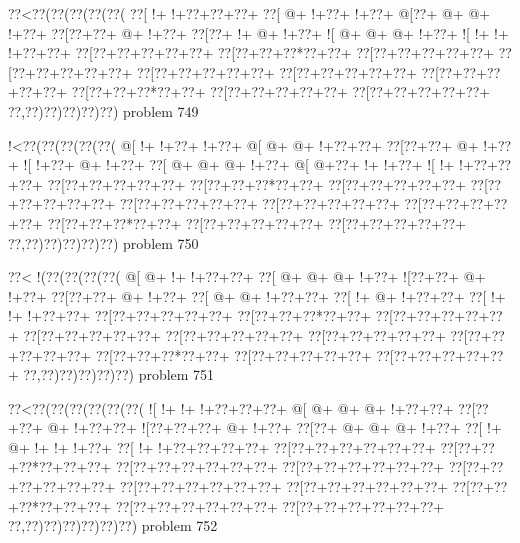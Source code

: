 \vbox{\vbox{\goo
\0??<\0??(\0??(\0??(\0??(\0??(
\0??[\- !+\- !+\0??+\0??+\0??+
\0??[\- @+\- !+\0??+\- !+\0??+
\- @[\0??+\- @+\- @+\- !+\0??+
\0??[\0??+\0??+\- @+\- !+\0??+
\0??[\0??+\- !+\- @+\- !+\0??+
\- ![\- @+\- @+\- @+\- !+\0??+
\- ![\- !+\- !+\- !+\0??+\0??+
\0??[\0??+\0??+\0??+\0??+\0??+
\0??[\0??+\0??+\0??*\0??+\0??+
\0??[\0??+\0??+\0??+\0??+\0??+
\0??[\0??+\0??+\0??+\0??+\0??+
\0??[\0??+\0??+\0??+\0??+\0??+
\0??[\0??+\0??+\0??+\0??+\0??+
\0??[\0??+\0??+\0??+\0??+\0??+
\0??[\0??+\0??+\0??*\0??+\0??+
\0??[\0??+\0??+\0??+\0??+\0??+
\0??[\0??+\0??+\0??+\0??+\0??+
\0??,\0??)\0??)\0??)\0??)\0??)
}
\hfil problem 749\hfil\break
}

\vbox{\vbox{\goo
\- !<\0??(\0??(\0??(\0??(\0??(
\- @[\- !+\- !+\0??+\- !+\0??+
\- @[\- @+\- @+\- !+\0??+\0??+
\0??[\0??+\0??+\- @+\- !+\0??+
\- ![\- !+\0??+\- @+\- !+\0??+
\0??[\- @+\- @+\- @+\- !+\0??+
\- @[\- @+\0??+\- !+\- !+\0??+
\- ![\- !+\- !+\0??+\0??+\0??+
\0??[\0??+\0??+\0??+\0??+\0??+
\0??[\0??+\0??+\0??*\0??+\0??+
\0??[\0??+\0??+\0??+\0??+\0??+
\0??[\0??+\0??+\0??+\0??+\0??+
\0??[\0??+\0??+\0??+\0??+\0??+
\0??[\0??+\0??+\0??+\0??+\0??+
\0??[\0??+\0??+\0??+\0??+\0??+
\0??[\0??+\0??+\0??*\0??+\0??+
\0??[\0??+\0??+\0??+\0??+\0??+
\0??[\0??+\0??+\0??+\0??+\0??+
\0??,\0??)\0??)\0??)\0??)\0??)
}
\hfil problem 750\hfil\break
}

\vbox{\vbox{\goo
\0??<\- !(\0??(\0??(\0??(\0??(
\- @[\- @+\- !+\- !+\0??+\0??+
\0??[\- @+\- @+\- @+\- !+\0??+
\- ![\0??+\0??+\- @+\- !+\0??+
\0??[\0??+\0??+\- @+\- !+\0??+
\0??[\- @+\- @+\- !+\0??+\0??+
\0??[\- !+\- @+\- !+\0??+\0??+
\0??[\- !+\- !+\- !+\0??+\0??+
\0??[\0??+\0??+\0??+\0??+\0??+
\0??[\0??+\0??+\0??*\0??+\0??+
\0??[\0??+\0??+\0??+\0??+\0??+
\0??[\0??+\0??+\0??+\0??+\0??+
\0??[\0??+\0??+\0??+\0??+\0??+
\0??[\0??+\0??+\0??+\0??+\0??+
\0??[\0??+\0??+\0??+\0??+\0??+
\0??[\0??+\0??+\0??*\0??+\0??+
\0??[\0??+\0??+\0??+\0??+\0??+
\0??[\0??+\0??+\0??+\0??+\0??+
\0??,\0??)\0??)\0??)\0??)\0??)
}
\hfil problem 751\hfil\break
}

\vbox{\vbox{\goo
\0??<\0??(\0??(\0??(\0??(\0??(\0??(
\- ![\- !+\- !+\- !+\0??+\0??+\0??+
\- @[\- @+\- @+\- @+\- !+\0??+\0??+
\0??[\0??+\0??+\- @+\- !+\0??+\0??+
\- ![\0??+\0??+\0??+\- @+\- !+\0??+
\0??[\0??+\- @+\- @+\- @+\- !+\0??+
\0??[\- !+\- @+\- !+\- !+\- !+\0??+
\0??[\- !+\- !+\0??+\0??+\0??+\0??+
\0??[\0??+\0??+\0??+\0??+\0??+\0??+
\0??[\0??+\0??+\0??*\0??+\0??+\0??+
\0??[\0??+\0??+\0??+\0??+\0??+\0??+
\0??[\0??+\0??+\0??+\0??+\0??+\0??+
\0??[\0??+\0??+\0??+\0??+\0??+\0??+
\0??[\0??+\0??+\0??+\0??+\0??+\0??+
\0??[\0??+\0??+\0??+\0??+\0??+\0??+
\0??[\0??+\0??+\0??*\0??+\0??+\0??+
\0??[\0??+\0??+\0??+\0??+\0??+\0??+
\0??[\0??+\0??+\0??+\0??+\0??+\0??+
\0??,\0??)\0??)\0??)\0??)\0??)\0??)
}
\hfil problem 752\hfil\break
}

